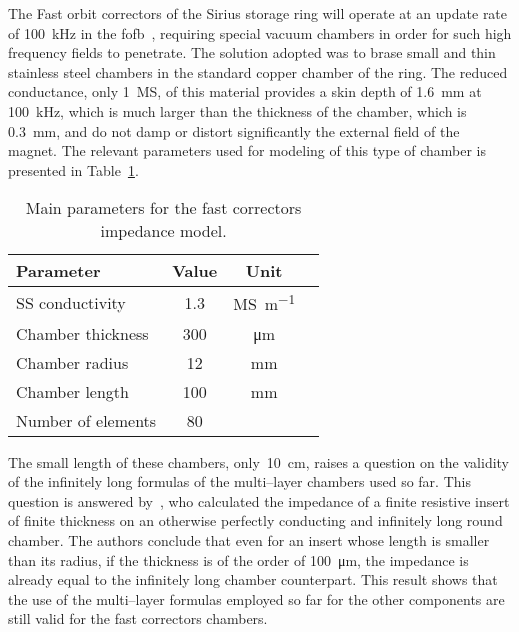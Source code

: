     The Fast orbit correctors of the Sirius storage ring will operate at an update rate of \SI{100}{\kilo\hertz} in the \gls{fofb}~\cite{Tavares2013}, requiring special vacuum chambers in order for such high frequency fields to penetrate. The solution adopted was to brase small and thin stainless steel chambers in the standard copper chamber of the ring. The reduced conductance, only \SI{1}{\mega\siemens}, of this material provides a skin depth of \SI{1.6}{\milli\meter} at \SI{100}{\kilo\hertz}, which is much larger than the thickness of the chamber, which is \SI{0.3}{\milli\meter}, and do not damp or distort significantly the external field of the magnet. The relevant parameters used for modeling of this type of chamber is presented in Table~\ref{tab:fast_correctors_chamber_parameters}.
    \begin{table}
        \centering
        \caption{Main parameters for the fast correctors impedance model.}
        \label{tab:fast_correctors_chamber_parameters}
        \begin{tabular}{lccc}
            \toprule
            Parameter            & Value      & Unit \\
            \midrule
            SS conductivity      & 1.3  & \si{\mega\siemens\per\meter}\\
            Chamber thickness    & 300  & \si{\micro\meter}\\
            Chamber radius       & 12   & \si{\milli\meter}\\
            Chamber length       & 100  & \si{\milli\meter}\\
            Number of elements   &  80  & \\
            \bottomrule
        \end{tabular}
    \end{table}

    The small length of these chambers, only~\SI{10}{\centi\meter}, raises a question on the validity of the infinitely long formulas of the multi--layer chambers used so far. This question is answered by~, who calculated the impedance of a finite resistive insert of finite thickness on an otherwise perfectly conducting and infinitely long round chamber. The authors conclude that even for an insert whose length is smaller than its radius, if the thickness is of the order of \SI{100}{\micro\meter}, the impedance is already equal to the infinitely long chamber counterpart. This result shows that the use of the multi--layer formulas employed so far for the other components are still valid for the fast correctors chambers.

